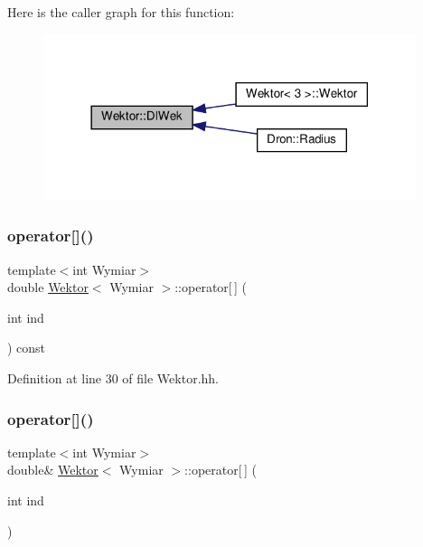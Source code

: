Here is the caller graph for this function\+:
\nopagebreak
\begin{figure}[H]
\begin{center}
\leavevmode
\includegraphics[width=309pt]{class_wektor_a49964f91d93ff53bd4152665fd93e57d_icgraph}
\end{center}
\end{figure}
\mbox{\label{class_wektor_a49876d44218344c450fe9e13d9c7e885}} 
\subsubsection{\texorpdfstring{operator[]()}{operator[]()}\hspace{0.1cm}{\footnotesize\ttfamily [1/2]}}
{\footnotesize\ttfamily template$<$int Wymiar$>$ \\
double \hyperlink{class_wektor}{Wektor}$<$ Wymiar $>$\+::operator\mbox{[}$\,$\mbox{]} (\begin{DoxyParamCaption}\item[{int}]{ind }\end{DoxyParamCaption}) const\hspace{0.3cm}{\ttfamily [inline]}}



Definition at line 30 of file Wektor.\+hh.

\mbox{\label{class_wektor_a88d91e6a337390c1e6ab527970c392a4}} 
\subsubsection{\texorpdfstring{operator[]()}{operator[]()}\hspace{0.1cm}{\footnotesize\ttfamily [2/2]}}
{\footnotesize\ttfamily template$<$int Wymiar$>$ \\
double\& \hyperlink{class_wektor}{Wektor}$<$ Wymiar $>$\+::operator\mbox{[}$\,$\mbox{]} (\begin{DoxyParamCaption}\item[{int}]{ind }\end{DoxyParamCaption})\hspace{0.3cm}{\ttfamily [inline]}}



